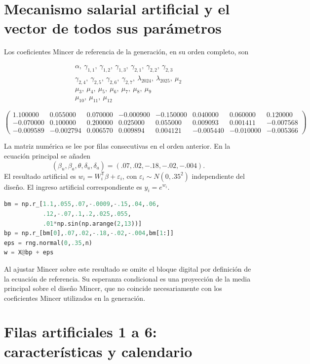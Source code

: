 \documentclass[11pt,a4paper]{article}
\begin{document}
\clearpage
\section{Mecanismo salarial artificial y el vector de todos sus parámetros}

Los coeficientes Mincer de referencia de la generación, en su orden completo, son

\[
\begin{gathered}\alpha,\ \gamma_{1,1},\ \gamma_{1,2},\ \gamma_{1,3},\ \gamma_{2,1},\ \gamma_{2,2},\ \gamma_{2,3}\\\gamma_{2,4},\ \gamma_{2,5},\ \gamma_{2,6},\ \gamma_{2,7},\ \lambda_{2024},\ \lambda_{2025},\ \mu_2\\\mu_3,\ \mu_4,\ \mu_5,\ \mu_6,\ \mu_7,\ \mu_8,\ \mu_9\\\mu_10,\ \mu_11,\ \mu_12\end{gathered}
\]

\[
\begin{pmatrix}1.100000 & 0.055000 & 0.070000 & -0.000900 & -0.150000 & 0.040000 & 0.060000 & 0.120000\\-0.070000 & 0.100000 & 0.200000 & 0.025000 & 0.055000 & 0.009093 & 0.001411 & -0.007568\\-0.009589 & -0.002794 & 0.006570 & 0.009894 & 0.004121 & -0.005440 & -0.010000 & -0.005366\end{pmatrix}
\]

La matriz numérica se lee por filas consecutivas en el orden anterior. En la ecuación principal se añaden
\[
(\beta_u,\beta_a,\theta,\delta_u,\delta_a)
=(.07,.02,-.18,-.02,-.004).
\]
El resultado artificial es $w_i=W_i^{\mathsf T}\beta+\varepsilon_i$, con
$\varepsilon_i\sim N(0,.35^2)$ independiente del diseño. El ingreso artificial correspondiente es $y_i=e^{w_i}$.
\begin{lstlisting}[language=Python]
bm = np.r_[1.1,.055,.07,-.0009,-.15,.04,.06,
           .12,-.07,.1,.2,.025,.055,
           .01*np.sin(np.arange(2,13))]
bp = np.r_[bm[0],.07,.02,-.18,-.02,-.004,bm[1:]]
eps = rng.normal(0,.35,n)
w = X@bp + eps
\end{lstlisting}
Al ajustar Mincer sobre este resultado se omite el bloque digital por definición de la ecuación de referencia. Su esperanza condicional es una proyección de la media principal sobre el diseño Mincer, que no coincide necesariamente con los coeficientes Mincer utilizados en la generación.

\clearpage
\section{Filas artificiales 1 a 6: características y calendario}
\end{document}

